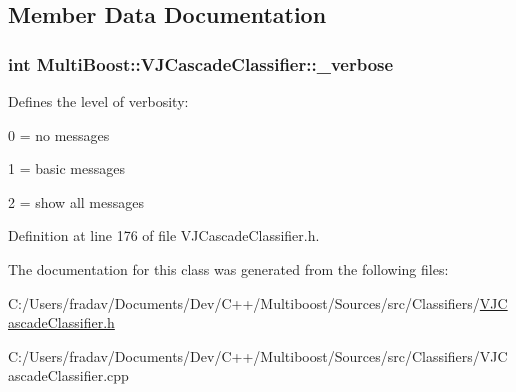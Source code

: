 \subsection{Member Data Documentation}
\hypertarget{classMultiBoost_1_1VJCascadeClassifier_a5c9ad0bad3ee3f055a0d48040e512575}{
\subsubsection[{\-\_\-verbose}]{\setlength{\rightskip}{0pt plus 5cm}int Multi\-Boost\-::\-V\-J\-Cascade\-Classifier\-::\-\_\-verbose\hspace{0.3cm}{\ttfamily [protected]}}}\label{classMultiBoost_1_1VJCascadeClassifier_a5c9ad0bad3ee3f055a0d48040e512575}
Defines the level of verbosity\-:
\begin{DoxyItemize}
\item 0 = no messages
\item 1 = basic messages
\item 2 = show all messages 
\end{DoxyItemize}

Definition at line 176 of file V\-J\-Cascade\-Classifier.\-h.



The documentation for this class was generated from the following files\-:\begin{DoxyCompactItemize}
\item 
C\-:/\-Users/fradav/\-Documents/\-Dev/\-C++/\-Multiboost/\-Sources/src/\-Classifiers/\hyperlink{VJCascadeClassifier_8h}{V\-J\-Cascade\-Classifier.\-h}\item 
C\-:/\-Users/fradav/\-Documents/\-Dev/\-C++/\-Multiboost/\-Sources/src/\-Classifiers/V\-J\-Cascade\-Classifier.\-cpp\end{DoxyCompactItemize}
